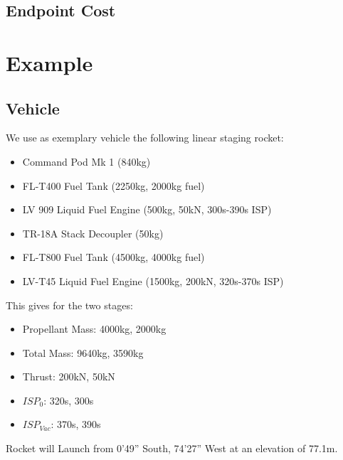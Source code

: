 \documentclass[11pt]{report}
\begin{document}
\section{Endpoint Cost}

\chapter{Example}

\section{Vehicle}

We use as exemplary vehicle the following linear staging rocket:

\begin{itemize}
\item Command Pod Mk 1 (840kg)
\item FL-T400 Fuel Tank (2250kg, 2000kg fuel)
\item LV 909 Liquid Fuel Engine (500kg, 50kN, 300s-390s ISP)
\item TR-18A Stack Decoupler (50kg)
\item FL-T800 Fuel Tank (4500kg, 4000kg fuel)
\item LV-T45 Liquid Fuel Engine (1500kg, 200kN, 320s-370s ISP)
\end{itemize}

This gives for the two stages:

\begin{itemize}
\item Propellant Mass: 4000kg, 2000kg
\item Total Mass: 9640kg, 3590kg
\item Thrust: 200kN, 50kN
\item $ISP_0$: 320s, 300s
\item $ISP_{Vac}$: 370s, 390s
\end{itemize}

Rocket will Launch from 0'49'' South, 74'27'' West at an elevation of 77.1m.
\end{document}
